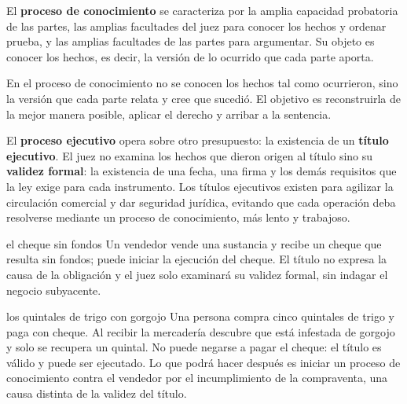 \documentclass[12pt,oneside]{book}
\begin{document}
El \textbf{proceso de conocimiento} se caracteriza por la amplia capacidad probatoria de las partes, las amplias facultades del juez para conocer los hechos y ordenar prueba, y las amplias facultades de las partes para argumentar. Su objeto es conocer los hechos, es decir, la versión de lo ocurrido que cada parte aporta.

\begin{importante}
En el proceso de conocimiento no se conocen los hechos tal como ocurrieron, sino la versión que cada parte relata y cree que sucedió. El objetivo es reconstruirla de la mejor manera posible, aplicar el derecho y arribar a la sentencia.
\end{importante}

El \textbf{proceso ejecutivo} opera sobre otro presupuesto: la existencia de un \textbf{título ejecutivo}. El juez no examina los hechos que dieron origen al título sino su \textbf{validez formal}: la existencia de una fecha, una firma y los demás requisitos que la ley exige para cada instrumento. Los títulos ejecutivos existen para agilizar la circulación comercial y dar seguridad jurídica, evitando que cada operación deba resolverse mediante un proceso de conocimiento, más lento y trabajoso.

\begin{ejemplo}{el cheque sin fondos}
Un vendedor vende una sustancia y recibe un cheque que resulta sin fondos; puede iniciar la ejecución del cheque. El título no expresa la causa de la obligación y el juez solo examinará su validez formal, sin indagar el negocio subyacente.
\end{ejemplo}

\begin{ejemplo}{los quintales de trigo con gorgojo}
Una persona compra cinco quintales de trigo y paga con cheque. Al recibir la mercadería descubre que está infestada de gorgojo y solo se recupera un quintal. No puede negarse a pagar el cheque: el título es válido y puede ser ejecutado. Lo que podrá hacer después es iniciar un proceso de conocimiento contra el vendedor por el incumplimiento de la compraventa, una causa distinta de la validez del título.
\end{ejemplo}
\end{document}
